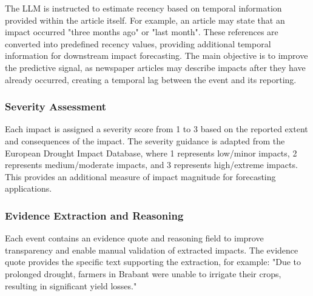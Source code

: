 The LLM is instructed to estimate recency based on temporal information provided within the article itself. For example, an article may state that an impact occurred "three months ago" or "last month". These references are converted into predefined recency values, providing additional temporal information for downstream impact forecasting. The main objective is to improve the predictive signal, as newspaper articles may describe impacts after they have already occurred, creating a temporal lag between the event and its reporting.


\subsubsection{Severity Assessment}

Each impact is assigned a severity score from 1 to 3 based on the reported extent and consequences of the impact. The severity guidance is adapted from the European Drought Impact Database, where 1 represents low/minor impacts, 2 represents medium/moderate impacts, and 3 represents high/extreme impacts. This provides an additional measure of impact magnitude for forecasting applications.


\subsubsection{Evidence Extraction and Reasoning}

Each event contains an evidence quote and reasoning field to improve transparency and enable manual validation of extracted impacts. The evidence quote provides the specific text supporting the extraction, for example: "Due to prolonged drought, farmers in Brabant were unable to irrigate their crops, resulting in significant yield losses."









